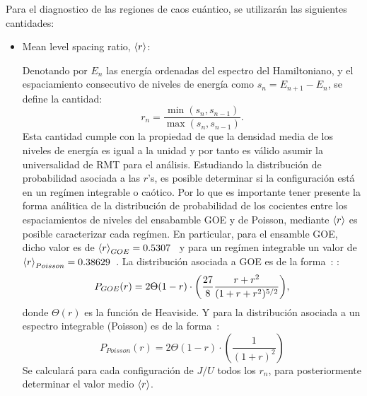 \documentclass[spanish,titlepage,table]{practicas}
\begin{document}
Para el diagnostico de las regiones de caos cuántico, se utilizarán las siguientes cantidades:
\begin{itemize}
    \item Mean level spacing ratio, $\ev{r}$:

Denotando por $E_n$ las energía ordenadas del espectro del Hamiltoniano, y el espaciamiento consecutivo de niveles de energía como 
$s_n=E_{n+1}-E_{n}$, se define la cantidad:
\begin{equation}
	r_n=\frac{\min(s_n,s_{n-1})}{\max(s_n,s_{n-1})}.
\end{equation}
Esta cantidad cumple con la propiedad de que la densidad media de los niveles de energía es igual a la unidad
y por tanto es válido asumir la universalidad de RMT para el análisis.
Estudiando la distribución de probabilidad asociada a las $r$'s, es posible determinar si la configuración está en un regímen integrable 
o caótico. Por lo que es importante tener presente la forma análitica de la distribución de probabilidad de los cocientes entre 
los espaciamientos de niveles del ensabamble GOE y de Poisson, mediante $\ev{r}$ es posible caracterizar cada 
regímen. En particular, para el ensamble GOE, dicho valor es de $\ev{r}_{GOE}=0.5307$~\cite{Atas_2013} y para un regímen integrable un valor de $\ev{r}_{Poisson}=0.38629$~\cite{Atas_2013}. 
La distribución asociada a GOE es de la forma~\cite{Atas_2013}:
 :
\begin{equation}
 P_{GOE}(r)=2\Theta(1-r)\cdot \qty(\frac{27}{8}\frac{r+r^{2}}{(1+r+r^{2})^{5/2}}),
\end{equation}
donde $\Theta(r)$ es la función de Heaviside.
Y para la distribución asociada a un espectro integrable (Poisson) es de la forma~\cite{Tekur2020}:
\begin{equation}
    P_{Poisson}(r)=2\Theta(1-r)\cdot(\frac{1}{(1+r)^{2}})
\end{equation}
    Se calculará para cada configuración de $J/U$ todos los $r_n$, para posteriormente determinar el valor medio $\ev{r}$.


\end{itemize}
\end{document}
